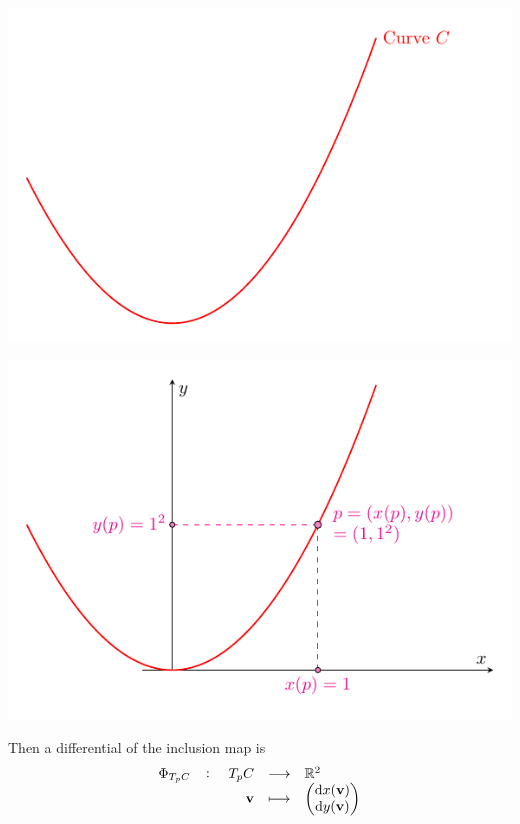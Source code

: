 \documentclass[11pt,openany]{article}
\renewcommand{\vec}[1]{\mathbf{#1}}
\begin{document}
\begin{center}
\begin{minipage}{.45\textwidth}
	\includegraphics[scale=1]{tangent-space-example-3.pdf}
\end{minipage}
\begin{minipage}{.45\textwidth}
	\includegraphics[scale=1]{tangent-space-example-3-1.pdf}
\end{minipage}
\end{center}
Then a differential of the inclusion map is \[
\fullfunction{\Phi_{T_pC}}{T_pC}{\R^2}{\vec{v}}{
	\begin{pmatrix}
		\mathrm{d}x(\vec{v})\\
		\mathrm{d}y(\vec{v})
	\end{pmatrix}
}
\]
\end{document}
